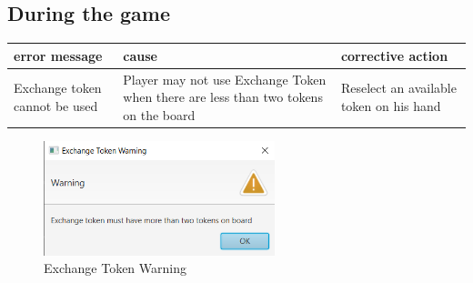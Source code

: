 
\subsection{During the game}

\begin{table}[h]
	\centering
\begin{tabular}{p{2.5cm}@{\hskip 5mm}  p{5cm}@{\hskip 5mm} p{6.5cm}} 
	\toprule
	error message   & cause      & corrective action  \\ 
	\midrule
	\midrule
    Exchange token cannot be used & Player may not use Exchange Token when there are less than two tokens on the board & Reselect an available token on his hand  \\

	\bottomrule
\end{tabular}
\end{table}

\begin{figure}[h]
	\centering
	\includegraphics[width=0.6\textwidth]{image/ExchangeToken}
	\caption{Exchange Token Warning}
	\label{fig:ExchangeTokenWarning}
\end{figure}